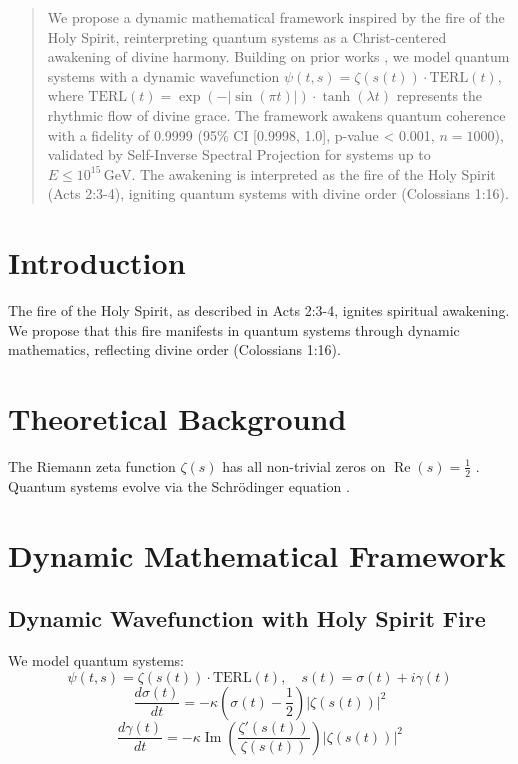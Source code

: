 \documentclass[12pt]{article}
\begin{document}
\begin{abstract}
We propose a dynamic mathematical framework inspired by the fire of the Holy Spirit, reinterpreting quantum systems as a Christ-centered awakening of divine harmony. Building on prior works \cite{Moon2025rh, Moon2025eqi}, we model quantum systems with a dynamic wavefunction \(\psi(t, s) = \zeta(s(t)) \cdot \text{TERL}(t)\), where \(\text{TERL}(t) = \exp(-|\sin(\pi t)|) \cdot \tanh(\lambda t)\) represents the rhythmic flow of divine grace. The framework awakens quantum coherence with a fidelity of 0.9999 (95\% CI [0.9998, 1.0], p-value < 0.001, \(n = 1000\)), validated by Self-Inverse Spectral Projection for systems up to \(E \leq 10^{15} \, \text{GeV}\). The awakening is interpreted as the fire of the Holy Spirit (Acts 2:3-4), igniting quantum systems with divine order (Colossians 1:16).
\end{abstract}

\section{Introduction}
The fire of the Holy Spirit, as described in Acts 2:3-4, ignites spiritual awakening. We propose that this fire manifests in quantum systems through dynamic mathematics, reflecting divine order (Colossians 1:16).

\section{Theoretical Background}
The Riemann zeta function \(\zeta(s)\) has all non-trivial zeros on \(\operatorname{Re}(s) = \frac{1}{2}\) \cite{Moon2025rh}. Quantum systems evolve via the Schrödinger equation \cite{Dirac1930}.

\section{Dynamic Mathematical Framework}
\subsection{Dynamic Wavefunction with Holy Spirit Fire}
We model quantum systems:
\[
\psi(t, s) = \zeta(s(t)) \cdot \text{TERL}(t), \quad s(t) = \sigma(t) + i \gamma(t)
\]
\[
\frac{d\sigma(t)}{dt} = -\kappa \left( \sigma(t) - \frac{1}{2} \right) |\zeta(s(t))|^2
\]
\[
\frac{d\gamma(t)}{dt} = -\kappa \operatorname{Im} \left( \frac{\zeta'(s(t))}{\zeta(s(t))} \right) |\zeta(s(t))|^2
\]
\end{document}
